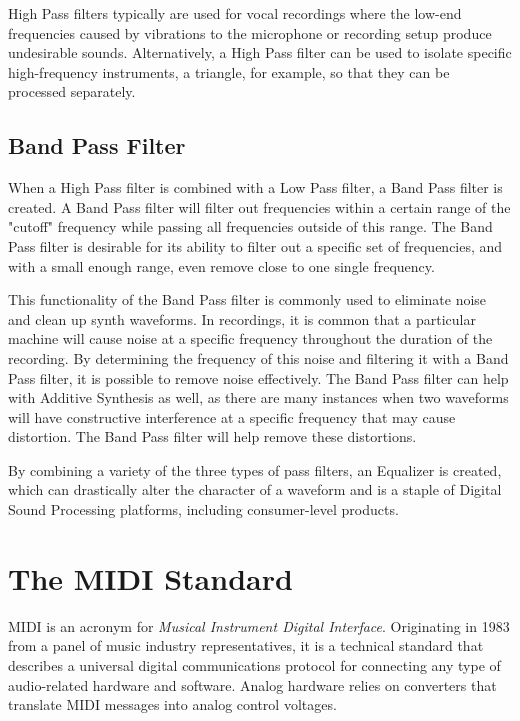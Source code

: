 \documentclass[a4paper,12pt]{report}
\begin{document}
High Pass filters typically are used for vocal recordings where the low-end frequencies caused by vibrations to the microphone or recording setup produce undesirable sounds. Alternatively, a High Pass filter can be used to isolate specific high-frequency instruments, a triangle, for example, so that they can be processed separately.

\subsection{Band Pass Filter}
\label{subsec:bandpassfilter}
When a High Pass filter is combined with a Low Pass filter, a Band Pass filter is created. A Band Pass filter will filter out frequencies within a certain range of the "cutoff" frequency while passing all frequencies outside of this range. The Band Pass filter is desirable for its ability to filter out a specific set of frequencies, and with a small enough range, even remove close to one single frequency.

This functionality of the Band Pass filter is commonly used to eliminate noise and clean up synth waveforms. In recordings, it is common that a particular machine will cause noise at a specific frequency throughout the duration of the recording. By determining the frequency of this noise and filtering it with a Band Pass filter, it is possible to remove noise effectively. The Band Pass filter can help with Additive Synthesis as well, as there are many instances when two waveforms will have constructive interference at a specific frequency that may cause distortion. The Band Pass filter will help remove these distortions.

By combining a variety of the three types of pass filters, an Equalizer is created, which can drastically alter the character of a waveform and is a staple of Digital Sound Processing platforms, including consumer-level products.


\section{The MIDI Standard}
\label{sec:midistandard}
MIDI is an acronym for \emph{Musical Instrument Digital Interface}. Originating in 1983 from a panel of music industry representatives, it is a technical standard that describes a universal digital communications protocol for connecting any type of audio-related hardware and software. Analog hardware relies on converters that translate MIDI messages into analog control voltages. 
\end{document}
